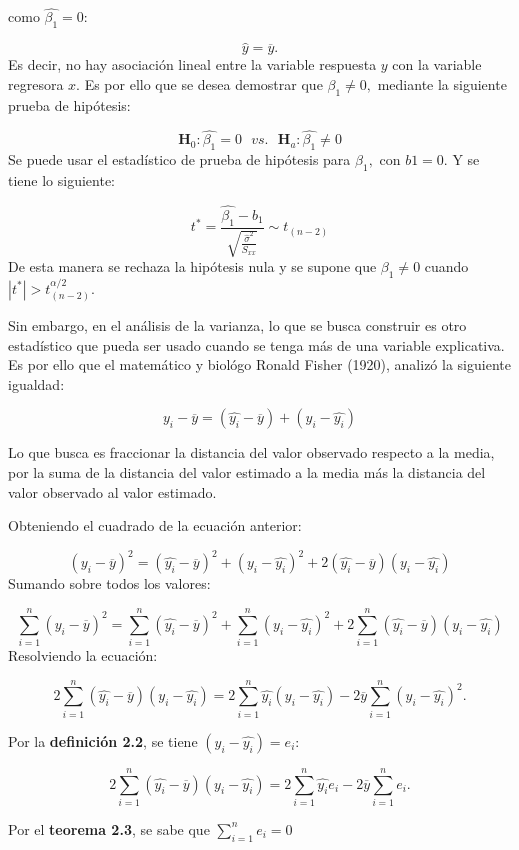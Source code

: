 \documentclass[
  a4paper,
  oneside,
  openany]{book}
\begin{document}
como \(\hat{\beta_{1}}=0:\)

\[\hat{y}=\overline{y}.\]
Es decir, no hay asociación lineal entre la variable respuesta \(y\) con la variable regresora \(x\). Es por ello que se desea demostrar que \(\beta_{1}\neq 0,\) mediante la siguiente prueba de hipótesis:

\[\textbf{H}_0:\hat{\beta_{1}}=0 \ \ \ vs. \ \ \ \textbf{H}_a:\hat{\beta_{1}} \neq 0\]
Se puede usar el estadístico de prueba de hipótesis para \(\beta_{1},\) con \(b1=0\). Y se tiene lo siguiente:

\[t^*=\frac{\hat{\beta_{1}}-b_{1}}{\sqrt{\frac{\hat{\sigma}^2}{S_{xx}}}} \sim t_{(n-2)}\]
De esta manera se rechaza la hipótesis nula y se supone que \(\beta_{1}\neq 0\) cuando \(|t^*|>t^{\alpha/2}_{(n-2)}\).

Sin embargo, en el análisis de la varianza, lo que se busca construir es otro estadístico que pueda ser usado cuando se tenga más de una variable explicativa. Es por ello que el matemático y biológo Ronald Fisher (1920), analizó la siguiente igualdad:

\[y_{i}-\overline{y}=(\hat{y_{i}}-\overline{y})+(y_{i}-\hat{y_{i}})\]

Lo que busca es fraccionar la distancia del valor observado respecto a la media, por la suma de la distancia del valor estimado a la media más la distancia del valor observado al valor estimado.

Obteniendo el cuadrado de la ecuación anterior:

\[(y_{i}-\overline{y})^2=(\hat{y_{i}}-\overline{y})^2+(y_{i}-\hat{y_{i}})^2+2(\hat{y_{i}}-\overline{y})(y_{i}-\hat{y_{i}})\]
Sumando sobre todos los valores:

\[\sum_{i=1}^{n}(y_{i}-\overline{y})^2=\sum_{i=1}^{n}(\hat{y_{i}}-\overline{y})^2+\sum_{i=1}^{n}(y_{i}-\hat{y_{i}})^2+2\sum_{i=1}^{n}(\hat{y_{i}}-\overline{y})(y_{i}-\hat{y_{i}})\]
Resolviendo la ecuación:

\[2\sum_{i=1}^{n}(\hat{y_{i}}-\overline{y})(y_{i}-\hat{y_{i}})=2\sum_{i=1}^{n}\hat{y_{i}}(y_{i}-\hat{y_{i}})-2\overline{y}\sum_{i=1}^{n}(y_{i}-\hat{y_{i}})^2.\]

Por la \textbf{definición 2.2}, se tiene \((y_{i}-\hat{y_{i}})=e_{i}\):

\[2\sum_{i=1}^{n}(\hat{y_{i}}-\overline{y})(y_{i}-\hat{y_{i}})=2\sum_{i=1}^{n}\hat{y_{i}}e_{i}-2\overline{y}\sum_{i=1}^{n}e_{i}.\]

Por el \textbf{teorema 2.3}, se sabe que \(\sum_{i=1}^{n}e_{i}=0\)
\end{document}
